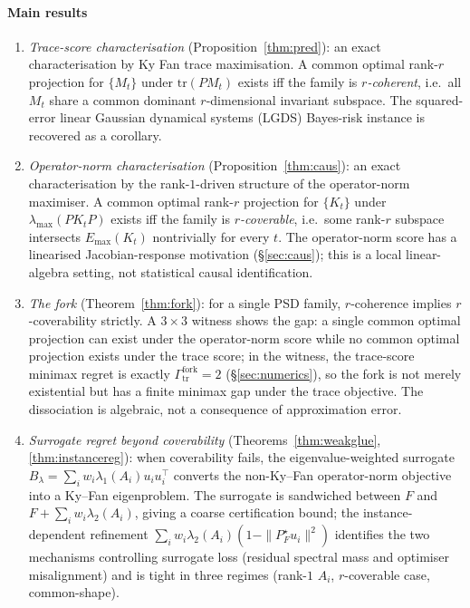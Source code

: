 \documentclass[final,3p,times]{elsarticle}
\newcommand{\tr}{\mathrm{tr}}
\newcommand{\Emax}{E_{\max}}
\begin{document}
\paragraph{Main results}
\begin{enumerate}
\item \emph{Trace-score characterisation} (Proposition~\ref{thm:pred}):
an exact characterisation by Ky Fan trace maximisation.
A common optimal rank-$r$ projection for $\{M_t\}$ under
$\tr(PM_t)$ exists iff the family is \emph{$r$-coherent}, i.e.\
all $M_t$ share a common dominant $r$-dimensional invariant subspace.
The squared-error linear Gaussian dynamical systems (LGDS) Bayes-risk
instance is recovered as a corollary.

\item \emph{Operator-norm characterisation} (Proposition~\ref{thm:caus}):
an exact characterisation by the rank-$1$-driven structure of the
operator-norm maximiser.
A common optimal rank-$r$ projection for $\{K_t\}$ under
$\lambda_{\max}(PK_tP)$ exists iff the family is \emph{$r$-coverable},
i.e.\ some rank-$r$ subspace intersects $\Emax(K_t)$ nontrivially for
every $t$.
The operator-norm score has a linearised Jacobian-response motivation
(\S\ref{sec:caus}); this is a local linear-algebra setting, not
statistical causal identification.

\item \emph{The fork} (Theorem~\ref{thm:fork}): for a single PSD family,
$r$-coherence implies $r$-coverability strictly.
A $3\times 3$ witness shows the gap: a single common optimal projection
can exist under the operator-norm score while no common optimal
projection exists under the trace score; in the witness, the
trace-score minimax regret is exactly $\Gamma^{\mathrm{fork}}_{\mathrm{tr}}=2$
(\S\ref{sec:numerics}), so the fork is not merely existential but has a
finite minimax gap under the trace objective.
The dissociation is algebraic, not a consequence of approximation error.

\item \emph{Surrogate regret beyond coverability}
(Theorems~\ref{thm:weakglue}, \ref{thm:instancereg}): when coverability
fails, the eigenvalue-weighted surrogate
$B_\lambda = \sum_i w_i \lambda_1(A_i) u_i u_i^\top$ converts the
non-Ky--Fan operator-norm objective into a Ky--Fan eigenproblem.
The surrogate is sandwiched between $F$ and
$F + \sum_i w_i\lambda_2(A_i)$, giving a coarse certification bound;
the instance-dependent refinement
$\sum_i w_i \lambda_2(A_i)(1-\|P_F^\star u_i\|^2)$ identifies the two
mechanisms controlling surrogate loss (residual spectral mass and
optimiser misalignment) and is tight in three regimes (rank-$1$ $A_i$,
$r$-coverable case, common-shape).
\end{enumerate}
\end{document}

